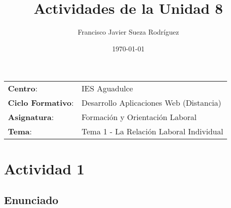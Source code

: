 


\title{
\vspace{10ex}
\normalfont \normalsize
\huge \textbf{Actividades de la Unidad 8}
}
\author{Francisco Javier Sueza Rodríguez}
\date{\normalsize\today}



\maketitle

\thispagestyle{empty}

\vspace{75ex}

\begin{center}
    \begin{tabular}{l l}
        \textbf{Centro}: & IES Aguadulce \\
        \textbf{Ciclo Formativo}: & Desarrollo Aplicaciones Web (Distancia)\\
        \textbf{Asignatura}: & Formación y Orientación Laboral\\
        \textbf{Tema}: & Tema 1 -  La Relación Laboral Individual\\
    \end{tabular}
\end{center}

\newpage

\section{Actividad 1}
\subsection{Enunciado}


